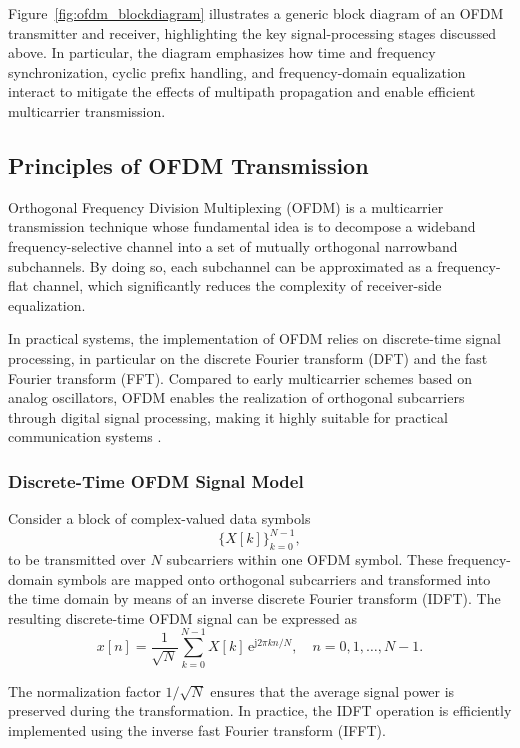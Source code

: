 Figure~\ref{fig:ofdm_blockdiagram} illustrates a generic block diagram of an OFDM transmitter and receiver, highlighting the key signal-processing stages discussed above. In particular, the diagram emphasizes how time and frequency synchronization, cyclic prefix handling, and frequency-domain equalization interact to mitigate the effects of multipath propagation and enable efficient multicarrier transmission.

\subsection{Principles of OFDM Transmission}

Orthogonal Frequency Division Multiplexing (OFDM) is a multicarrier transmission technique whose fundamental idea is to decompose a wideband frequency-selective channel into a set of mutually orthogonal narrowband subchannels. By doing so, each subchannel can be approximated as a frequency-flat channel, which significantly reduces the complexity of receiver-side equalization.

In practical systems, the implementation of OFDM relies on discrete-time signal processing, in particular on the discrete Fourier transform (DFT) and the fast Fourier transform (FFT). Compared to early multicarrier schemes based on analog oscillators, OFDM enables the realization of orthogonal subcarriers through digital signal processing, making it highly suitable for practical communication systems \cite{nee2000ofdm,haring_ofdm_lecture}.

\subsubsection{Discrete-Time OFDM Signal Model}

Consider a block of complex-valued data symbols
\[
\{X[k]\}_{k=0}^{N-1},
\]
to be transmitted over $N$ subcarriers within one OFDM symbol. These frequency-domain symbols are mapped onto orthogonal subcarriers and transformed into the time domain by means of an inverse discrete Fourier transform (IDFT). The resulting discrete-time OFDM signal can be expressed as
\begin{equation}
x[n] = \frac{1}{\sqrt{N}} \sum_{k=0}^{N-1} X[k]\,\mathrm{e}^{\mathrm{j}2\pi kn/N}, 
\quad n = 0,1,\dots,N-1.
\end{equation}

The normalization factor $1/\sqrt{N}$ ensures that the average signal power is preserved during the transformation. In practice, the IDFT operation is efficiently implemented using the inverse fast Fourier transform (IFFT).

